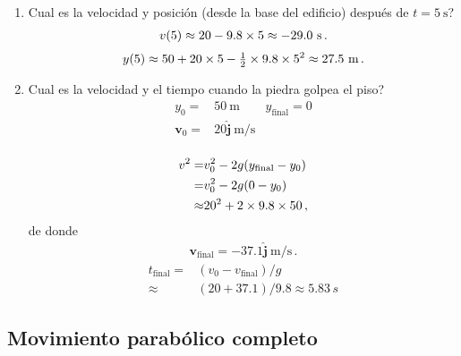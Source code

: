 \begin{itemize}
\begin{enumerate}
  \item \textquestiondown Cual es la velocidad y posici\'on (desde la base del edificio) despu\'es de $t=5\ \text{s}$?
    \begin{align}
      v(5)\approx 20-9.8\times5\approx-29.0\ \text{s}\,.
    \end{align}
    \begin{align}
      y(5)\approx50+20\timesm5-\tfrac{1}{2}\timesm9.8\timesm5^2\approx27.5\ \text{m}\,.
    \end{align}
  \item \textquestiondown Cual es la velocidad y el tiempo cuando la piedra golpea el piso?
    \begin{align}
      y_0=&50\ \text{m} & y_{\text{final}}=0\nonumber\\
      \mathbf{v}_0=&20\hat{\mathbf{j}}\ \text{m/s} & \\
    \end{align}

    \begin{align}
      v^2=&v_0^2-2g(y_{\text{final}}-y_0)\nonumber\\
      =&v_0^2-2g(0-y_0)\nonumber\\
      \approx&20^2+2\times9.8\times 50\,,
    \end{align}
de donde
\begin{align}
  \mathbf{v}_{\text{final}}=-37.1 \hat{\mathbf{j}}\ \text{m/s}\,.
\end{align}
\begin{align}
  t_{\text{final}}=&(v_0-v_{\text{final}})/g\nonumber\\
  \approx&(20+37.1)/9.8\approx5.83\,s
\end{align}
  \end{enumerate}
\end{itemize}

\subsection{Movimiento parabólico completo}

